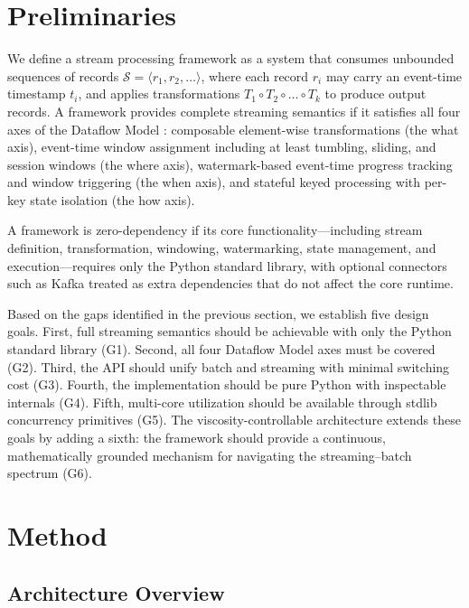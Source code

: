 \documentclass[conference]{IEEEtran}
\begin{document}
\section{Preliminaries}

We define a stream processing framework as a system that consumes unbounded sequences of records $\mathcal{S} = \langle r_1, r_2, \ldots \rangle$, where each record $r_i$ may carry an event-time timestamp $t_i$, and applies transformations $T_1 \circ T_2 \circ \ldots \circ T_k$ to produce output records. A framework provides complete streaming semantics if it satisfies all four axes of the Dataflow Model \cite{akidau2015data}: composable element-wise transformations (the what axis), event-time window assignment including at least tumbling, sliding, and session windows (the where axis), watermark-based event-time progress tracking and window triggering (the when axis), and stateful keyed processing with per-key state isolation (the how axis).

A framework is zero-dependency if its core functionality---including stream definition, transformation, windowing, watermarking, state management, and execution---requires only the Python standard library, with optional connectors such as Kafka treated as extra dependencies that do not affect the core runtime.

Based on the gaps identified in the previous section, we establish five design goals. First, full streaming semantics should be achievable with only the Python standard library (G1). Second, all four Dataflow Model axes must be covered (G2). Third, the API should unify batch and streaming with minimal switching cost (G3). Fourth, the implementation should be pure Python with inspectable internals (G4). Fifth, multi-core utilization should be available through stdlib concurrency primitives (G5). The viscosity-controllable architecture extends these goals by adding a sixth: the framework should provide a continuous, mathematically grounded mechanism for navigating the streaming--batch spectrum (G6).

\section{Method}

\subsection{Architecture Overview}
\end{document}
